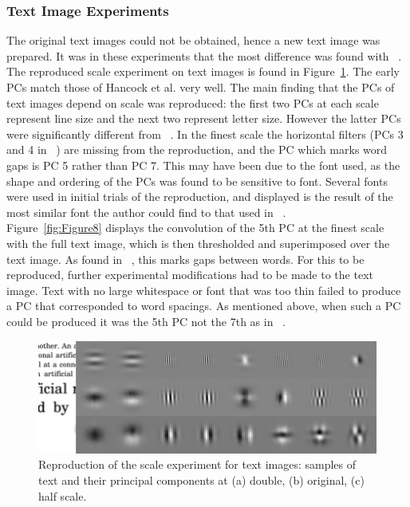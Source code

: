\subsubsection{Text Image Experiments}
The original text images could not be obtained, hence a new text image was prepared. It was in these experiments that the most difference was found with ~\cite{Hancock1992-mp}.\\
The reproduced scale experiment on text images is found in Figure~\ref{fig:Figure7}. The early PCs match those of Hancock et al. very well. The main finding that the PCs of text images depend on scale was reproduced: the first two PCs at each scale represent line size and the next two represent letter size. However the latter PCs were significantly different from ~\cite{Hancock1992-mp}. In the finest scale the horizontal filters (PCs 3 and 4 in ~\cite{Hancock1992-mp}) are missing from the reproduction, and the PC which marks word gaps is PC 5 rather than PC 7. This may have been due to the font used, as the shape and ordering of the PCs was found to be sensitive to font. Several fonts were used in initial trials of the reproduction, and displayed is the result of the most similar font the author could find to that used in ~\cite{Hancock1992-mp}.\\
Figure~\ref{fig:Figure8} displays the convolution of the 5th PC at the finest scale with the full text image, which is then thresholded and superimposed over the text image. As found in ~\cite{Hancock1992-mp}, this marks gaps between words. For this to be reproduced, further experimental modifications had to be made to the text image. Text with no large whitespace or font that was too thin failed to produce a PC that corresponded to word spacings. As mentioned above, when such a PC could be produced it was the 5th PC not the 7th as in ~\cite{Hancock1992-mp}. 
\begin{figure}
    \centering
    \includegraphics[scale=0.34]{figures/julia-fig7.png}
    \caption{Reproduction of the scale experiment for text images: samples of text and their principal components at (a) double, (b) original, (c) half scale.}
    \label{fig:Figure7}
\end{figure}
